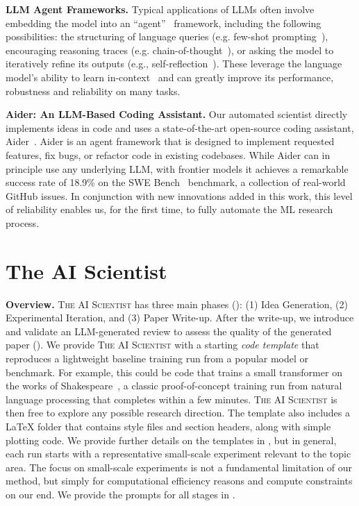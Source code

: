 \documentclass[11pt, a4paper]{include/gdm_format}
\newcommand{\ouralgo}{\textsc{The AI Scientist}\xspace}
\begin{document}
\textbf{LLM Agent Frameworks.}
Typical applications of LLMs often involve embedding the model into an ``agent''~\citep{llm_agent_survey} framework, including the following possibilities: the structuring of language queries (e.g. few-shot prompting~\citep{brown2020language}), encouraging reasoning traces (e.g. chain-of-thought~\citep{wei2022chain}), or asking the model to iteratively refine its outputs (e.g., self-reflection~\citep{shinn2024reflexion}).
These leverage the language model's ability to learn in-context~\citep{olsson2022context} and can greatly improve its performance, robustness and reliability on many tasks.

\textbf{Aider: An LLM-Based Coding Assistant.}
Our automated scientist directly implements ideas in code and uses a state-of-the-art open-source coding assistant, Aider~\citep{aider}.
Aider is an agent framework that is designed to implement requested features, fix bugs, or refactor code in existing codebases.
While Aider can in principle use any underlying LLM, with frontier models it achieves a remarkable success rate of 18.9\% on the SWE Bench~\citep{jimenez2024swebenchlanguagemodelsresolve} benchmark, a collection of real-world GitHub issues.
In conjunction with new innovations added in this work, this level of reliability enables us, for the first time, to fully automate the ML research process.

\section{The AI Scientist}
\label{sec:scientist}

\textbf{Overview.}
\ouralgo has three main phases (): (1) Idea Generation, (2) Experimental Iteration, and (3) Paper Write-up. After the write-up, we introduce and validate an LLM-generated review to assess the quality of the generated paper ().
We provide \ouralgo with a starting \emph{code template} that reproduces a lightweight baseline training run from a popular model or benchmark.
For example, this could be code that trains a small transformer on the works of Shakespeare~\citep{karpathy2022nanogpt}, a classic proof-of-concept training run from natural language processing that completes within a few minutes.
\ouralgo is then free to explore any possible research direction.
The template also includes a LaTeX folder that contains style files and section headers, along with simple plotting code.
We provide further details on the templates in , but in general, each run starts with a representative small-scale experiment relevant to the topic area.
The focus on small-scale experiments is not a fundamental limitation of our method, but simply for computational efficiency reasons and compute constraints on our end.
We provide the prompts for all stages in .
\end{document}
